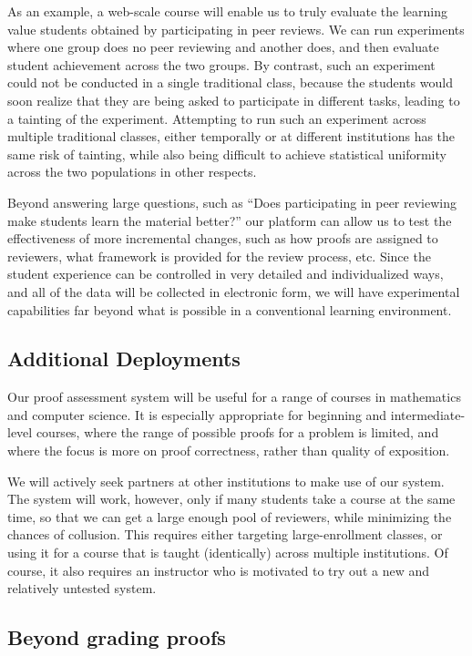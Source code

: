 \documentclass[12pt]{article}
\begin{document}
As an example, a web-scale course will enable us to truly evaluate the
learning value students obtained by participating in peer reviews.  We
can run experiments where one group does no peer reviewing and another
does, and then evaluate student achievement across the two groups.  By
contrast, such an experiment could not be conducted in a single
traditional class, because the students would soon realize that they
are being asked to participate in different tasks, leading to a
tainting of the experiment.  Attempting to run such an experiment
across multiple traditional classes, either temporally or at different
institutions has the same risk of tainting, while also being difficult
to achieve statistical uniformity across the two populations in other
respects.

Beyond answering large questions, such as ``Does participating in peer
reviewing make students learn the material better?'' our platform can
allow us to test the effectiveness of more incremental changes, such
as how proofs are assigned to reviewers, what framework is provided
for the review process, etc.  Since the student experience can be
controlled in very detailed and individualized ways, and all of the
data will be collected in electronic form, we will have experimental
capabilities far beyond what is possible in a conventional learning
environment.

\subsection{Additional Deployments}

Our proof assessment system will be useful for a range of courses in
mathematics and computer science.  It is especially appropriate for
beginning and intermediate-level courses, where the range of possible
proofs for a problem is limited, and where the focus is more on proof
correctness, rather than quality of exposition.

We will actively seek partners at other institutions to make use of
our system.  The system will work, however, only if many students take
a course at the same time, so that we can get a large enough pool of
reviewers, while minimizing the chances of collusion.  This requires
either targeting large-enrollment classes, or using it for a course
that is taught (identically) across multiple institutions.  Of course,
it also requires an instructor who is motivated to try
out a new and relatively untested system.

\subsection{Beyond grading proofs}
\end{document}
